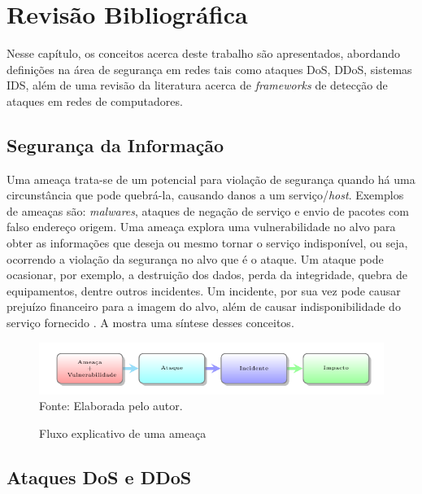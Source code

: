 \chapter[Revisão Bibliográfica]{Revisão Bibliográfica}
\label{fundamentacao}
Nesse capítulo, os conceitos acerca deste trabalho são apresentados, abordando definições na área de segurança em redes tais como ataques DoS, DDoS, sistemas IDS, além de uma revisão da literatura acerca de \textit{frameworks} de detecção de ataques em redes de computadores. 
\section{Segurança da Informação}
Uma ameaça trata-se de um potencial para violação de segurança quando há uma circunstância que pode quebrá-la, causando danos a um serviço/\textit{host}. Exemplos de ameaças são: \textit{malwares}, ataques de negação de serviço e envio de pacotes com falso endereço origem. Uma ameaça explora uma vulnerabilidade no alvo para obter as informações que deseja ou mesmo tornar o serviço indisponível, ou seja, ocorrendo a violação da segurança no alvo que é o ataque. Um ataque pode ocasionar, por exemplo, a destruição dos dados, perda da integridade, quebra de equipamentos, dentre outros incidentes. Um incidente, por sua vez pode causar prejuízo financeiro para a imagem do alvo, além de causar indisponibilidade do serviço fornecido \cite{kurose}. A  mostra uma síntese desses conceitos.   

 \begin{figure}[ht]
 	\centering
 	\caption{Fluxo explicativo de uma ameaça }
 	\includegraphics[width=1\textwidth]{figs/ameacas.pdf}\\
 	{Fonte: Elaborada pelo autor.}
 	\label{fig:ameacas}
 \end{figure}
 
 \section{Ataques DoS e DDoS}

